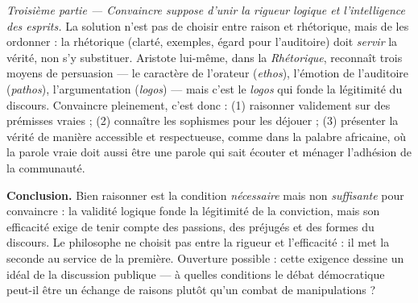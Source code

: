 \documentclass[11pt]{article}
\begin{document}
\begin{exoresolu}
\emph{Troisième partie — Convaincre suppose d'unir la rigueur logique et l'intelligence des esprits.} La solution n'est pas de choisir entre raison et rhétorique, mais de les ordonner : la rhétorique (clarté, exemples, égard pour l'auditoire) doit \emph{servir} la vérité, non s'y substituer. Aristote lui-même, dans la \emph{Rhétorique}, reconnaît trois moyens de persuasion — le caractère de l'orateur (\emph{ethos}), l'émotion de l'auditoire (\emph{pathos}), l'argumentation (\emph{logos}) — mais c'est le \emph{logos} qui fonde la légitimité du discours. Convaincre pleinement, c'est donc : (1) raisonner validement sur des prémisses vraies ; (2) connaître les sophismes pour les déjouer ; (3) présenter la vérité de manière accessible et respectueuse, comme dans la palabre africaine, où la parole vraie doit aussi être une parole qui sait écouter et ménager l'adhésion de la communauté.

\textbf{Conclusion.} Bien raisonner est la condition \emph{nécessaire} mais non \emph{suffisante} pour convaincre : la validité logique fonde la légitimité de la conviction, mais son efficacité exige de tenir compte des passions, des préjugés et des formes du discours. Le philosophe ne choisit pas entre la rigueur et l'efficacité : il met la seconde au service de la première. Ouverture possible : cette exigence dessine un idéal de la discussion publique — à quelles conditions le débat démocratique peut-il être un échange de raisons plutôt qu'un combat de manipulations ?
\end{exoresolu}
\end{document}
